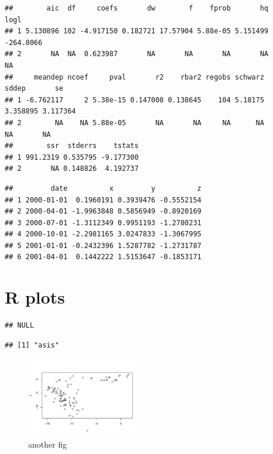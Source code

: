 \documentclass[
]{article}
\begin{document}
\begin{verbatim}
##        aic  df     coefs       dw        f    fprob       hq      logl
## 1 5.130896 102 -4.917150 0.182721 17.57904 5.88e-05 5.151499 -264.8066
## 2       NA  NA  0.623987       NA       NA       NA       NA        NA
##     meandep ncoef     pval       r2    rbar2 regobs schwarz    sddep       se
## 1 -6.762117     2 5.38e-15 0.147008 0.138645    104 5.18175 3.358895 3.117364
## 2        NA    NA 5.88e-05       NA       NA     NA      NA       NA       NA
##        ssr  stderrs    tstats
## 1 991.2319 0.535795 -9.177300
## 2       NA 0.148826  4.192737
\end{verbatim}

\begin{verbatim}
##         date          x         y          z
## 1 2000-01-01  0.1960191 0.3939476 -0.5552154
## 2 2000-04-01 -1.9963848 0.5856949 -0.8920169
## 3 2000-07-01 -1.3112349 0.9951193 -1.2780231
## 4 2000-10-01 -2.2981165 3.0247833 -1.3067995
## 5 2001-01-01 -0.2432396 1.5287782 -1.2731787
## 6 2001-04-01  0.1442222 1.5153647 -0.1853171
\end{verbatim}

\hypertarget{r-plots}{%
\section{R plots}\label{r-plots}}

\begin{verbatim}
## NULL
\end{verbatim}

\begin{verbatim}
## [1] "asis"
\end{verbatim}

\begin{figure}[h]

{\centering \includegraphics[width=0.45\textwidth]{test_engEviews_files/figure-latex/labe-1} 

}

\caption{another fig}\label{fig:labe}
\end{figure}
\end{document}
